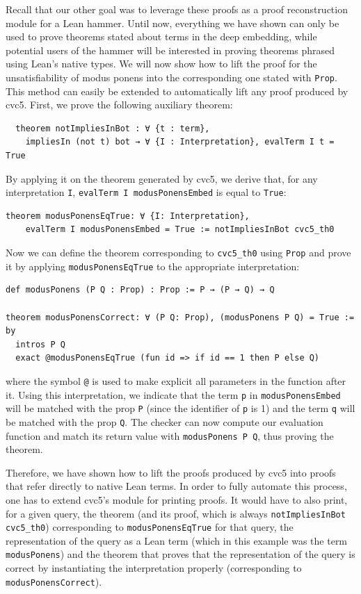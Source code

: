 Recall that our other goal was to leverage these proofs as a proof reconstruction
module for a Lean hammer. Until now, everything we have shown can only be used
to prove theorems stated about terms in the deep embedding, while potential users
of the hammer will be interested in proving theorems phrased using Lean's native types.
We will now show how to lift the proof for the unsatisfiability of modus ponens into the
corresponding one stated with \texttt{Prop}. This method can easily be extended to
automatically lift any proof produced by cvc5. First, we prove the following
auxiliary theorem:

\begin{verbatim}
  theorem notImpliesInBot : ∀ {t : term},
    impliesIn (not t) bot → ∀ {I : Interpretation}, evalTerm I t = True
\end{verbatim}

By applying it on the theorem generated by cvc5, we derive that, for any
interpretation \texttt{I}, \texttt{evalTerm I modusPonensEmbed} is equal
to \texttt{True}:

\begin{verbatim}
theorem modusPonensEqTrue: ∀ {I: Interpretation},
    evalTerm I modusPonensEmbed = True := notImpliesInBot cvc5_th0
\end{verbatim}

Now we can define the theorem corresponding to \texttt{cvc5\_th0} using
\texttt{Prop} and prove it by applying \texttt{modusPonensEqTrue} to
the appropriate interpretation:

\begin{verbatim}
def modusPonens (P Q : Prop) : Prop := P → (P → Q) → Q

theorem modusPonensCorrect: ∀ (P Q: Prop), (modusPonens P Q) = True := by
  intros P Q
  exact @modusPonensEqTrue (fun id => if id == 1 then P else Q)
\end{verbatim}
where the symbol \texttt{@} is used to make explicit all parameters
in the function after it. Using this interpretation, we indicate
that the term \texttt{p} in \texttt{modusPonensEmbed}
will be matched with the prop \texttt{P} (since the identifier of \texttt{p}
is 1) and the term \texttt{q} will be matched with the prop \texttt{Q}.
The checker can now compute our evaluation function and
match its return value with \texttt{modusPonens P Q}, thus proving the theorem.

Therefore, we have shown how to lift the proofs produced by cvc5 into proofs
that refer directly to native Lean terms. In order to fully automate this
process, one has to extend cvc5's module for printing proofs. It would
have to also print, for a given query, the theorem (and its proof, which is always
\texttt{notImpliesInBot cvc5\_th0}) corresponding to \texttt{modusPonensEqTrue} for that query,
the representation of the query as a Lean term (which in this example was the term \texttt{modusPonens})
and the theorem that proves that the representation of the query is correct by instantiating the interpretation
properly (corresponding to \texttt{modusPonensCorrect}).

